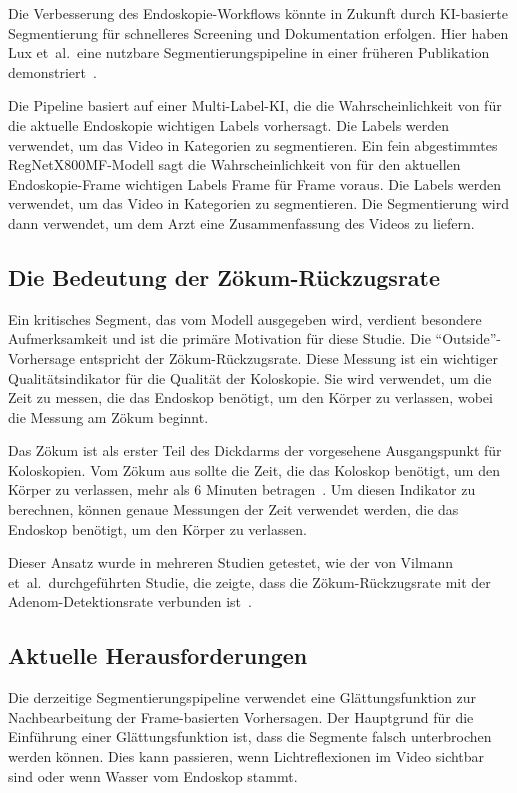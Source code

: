Die Verbesserung des Endoskopie-Workflows könnte in Zukunft durch KI-basierte Segmentierung für schnelleres Screening und Dokumentation erfolgen. Hier haben Lux et~al.\ eine nutzbare Segmentierungspipeline in einer früheren Publikation demonstriert~\citep{lux-2023}.

Die Pipeline basiert auf einer Multi-Label-KI, die die Wahrscheinlichkeit von für die aktuelle Endoskopie wichtigen Labels vorhersagt. Die Labels werden verwendet, um das Video in Kategorien zu segmentieren. Ein fein abgestimmtes RegNetX800MF-Modell sagt die Wahrscheinlichkeit von für den aktuellen Endoskopie-Frame wichtigen Labels Frame für Frame voraus. Die Labels werden verwendet, um das Video in Kategorien zu segmentieren. Die Segmentierung wird dann verwendet, um dem Arzt eine Zusammenfassung des Videos zu liefern.

\subsection{Die Bedeutung der Zökum-Rückzugsrate}

Ein kritisches Segment, das vom Modell ausgegeben wird, verdient besondere Aufmerksamkeit und ist die primäre Motivation für diese Studie. Die \enquote{Outside}-Vorhersage entspricht der Zökum-Rückzugsrate. Diese Messung ist ein wichtiger Qualitätsindikator für die Qualität der Koloskopie. Sie wird verwendet, um die Zeit zu messen, die das Endoskop benötigt, um den Körper zu verlassen, wobei die Messung am Zökum beginnt. 

Das Zökum ist als erster Teil des Dickdarms der vorgesehene Ausgangspunkt für Koloskopien. Vom Zökum aus sollte die Zeit, die das Koloskop benötigt, um den Körper zu verlassen, mehr als 6 Minuten betragen~\citep{profanter-2020,leung-2019}. Um diesen Indikator zu berechnen, können genaue Messungen der Zeit verwendet werden, die das Endoskop benötigt, um den Körper zu verlassen.

Dieser Ansatz wurde in mehreren Studien getestet, wie der von Vilmann et~al.\ durchgeführten Studie, die zeigte, dass die Zökum-Rückzugsrate mit der Adenom-Detektionsrate verbunden ist~\citep{vilmann-2022}.

\subsection{Aktuelle Herausforderungen}

Die derzeitige Segmentierungspipeline verwendet eine Glättungsfunktion zur Nachbearbeitung der Frame-basierten Vorhersagen. Der Hauptgrund für die Einführung einer Glättungsfunktion ist, dass die Segmente falsch unterbrochen werden können. Dies kann passieren, wenn Lichtreflexionen im Video sichtbar sind oder wenn Wasser vom Endoskop stammt.


